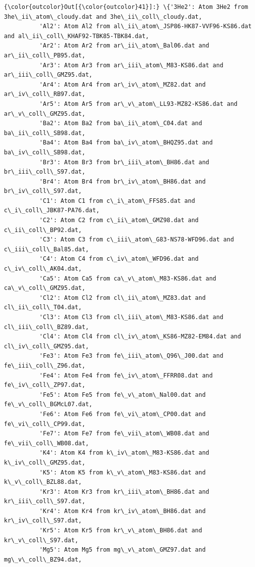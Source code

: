 \documentclass[11pt]{article}
\begin{document}
            \begin{Verbatim}[commandchars=\\\{\}]
{\color{outcolor}Out[{\color{outcolor}41}]:} \{'3He2': Atom 3He2 from 3he\_ii\_atom\_cloudy.dat and 3he\_ii\_coll\_cloudy.dat,
          'Al2': Atom Al2 from al\_ii\_atom\_JSP86-HK87-VVF96-KS86.dat and al\_ii\_coll\_KHAF92-TBK85-TBK84.dat,
          'Ar2': Atom Ar2 from ar\_ii\_atom\_Bal06.dat and ar\_ii\_coll\_PB95.dat,
          'Ar3': Atom Ar3 from ar\_iii\_atom\_M83-KS86.dat and ar\_iii\_coll\_GMZ95.dat,
          'Ar4': Atom Ar4 from ar\_iv\_atom\_MZ82.dat and ar\_iv\_coll\_RB97.dat,
          'Ar5': Atom Ar5 from ar\_v\_atom\_LL93-MZ82-KS86.dat and ar\_v\_coll\_GMZ95.dat,
          'Ba2': Atom Ba2 from ba\_ii\_atom\_C04.dat and ba\_ii\_coll\_SB98.dat,
          'Ba4': Atom Ba4 from ba\_iv\_atom\_BHQZ95.dat and ba\_iv\_coll\_SB98.dat,
          'Br3': Atom Br3 from br\_iii\_atom\_BH86.dat and br\_iii\_coll\_S97.dat,
          'Br4': Atom Br4 from br\_iv\_atom\_BH86.dat and br\_iv\_coll\_S97.dat,
          'C1': Atom C1 from c\_i\_atom\_FFS85.dat and c\_i\_coll\_JBK87-PA76.dat,
          'C2': Atom C2 from c\_ii\_atom\_GMZ98.dat and c\_ii\_coll\_BP92.dat,
          'C3': Atom C3 from c\_iii\_atom\_G83-NS78-WFD96.dat and c\_iii\_coll\_Bal85.dat,
          'C4': Atom C4 from c\_iv\_atom\_WFD96.dat and c\_iv\_coll\_AK04.dat,
          'Ca5': Atom Ca5 from ca\_v\_atom\_M83-KS86.dat and ca\_v\_coll\_GMZ95.dat,
          'Cl2': Atom Cl2 from cl\_ii\_atom\_MZ83.dat and cl\_ii\_coll\_T04.dat,
          'Cl3': Atom Cl3 from cl\_iii\_atom\_M83-KS86.dat and cl\_iii\_coll\_BZ89.dat,
          'Cl4': Atom Cl4 from cl\_iv\_atom\_KS86-MZ82-EM84.dat and cl\_iv\_coll\_GMZ95.dat,
          'Fe3': Atom Fe3 from fe\_iii\_atom\_Q96\_J00.dat and fe\_iii\_coll\_Z96.dat,
          'Fe4': Atom Fe4 from fe\_iv\_atom\_FFRR08.dat and fe\_iv\_coll\_ZP97.dat,
          'Fe5': Atom Fe5 from fe\_v\_atom\_Nal00.dat and fe\_v\_coll\_BGMcL07.dat,
          'Fe6': Atom Fe6 from fe\_vi\_atom\_CP00.dat and fe\_vi\_coll\_CP99.dat,
          'Fe7': Atom Fe7 from fe\_vii\_atom\_WB08.dat and fe\_vii\_coll\_WB08.dat,
          'K4': Atom K4 from k\_iv\_atom\_M83-KS86.dat and k\_iv\_coll\_GMZ95.dat,
          'K5': Atom K5 from k\_v\_atom\_M83-KS86.dat and k\_v\_coll\_BZL88.dat,
          'Kr3': Atom Kr3 from kr\_iii\_atom\_BH86.dat and kr\_iii\_coll\_S97.dat,
          'Kr4': Atom Kr4 from kr\_iv\_atom\_BH86.dat and kr\_iv\_coll\_S97.dat,
          'Kr5': Atom Kr5 from kr\_v\_atom\_BH86.dat and kr\_v\_coll\_S97.dat,
          'Mg5': Atom Mg5 from mg\_v\_atom\_GMZ97.dat and mg\_v\_coll\_BZ94.dat,

\end{Verbatim}
\end{document}
